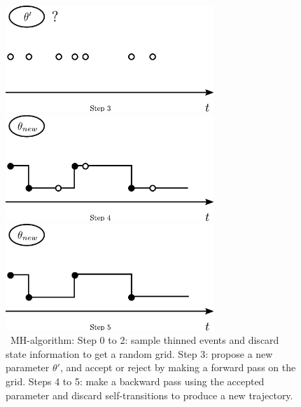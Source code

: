 \begin{figure}[H]
\begin{minipage}[!hp]{0.45\linewidth}
  \centering
    \includegraphics [width=0.70\textwidth, angle=0]{figs/plotn3.pdf}
    \vspace{-0 in}
  \end{minipage}
  \begin{minipage}[!hp]{0.45\linewidth}
  \centering
    \includegraphics [width=0.70\textwidth, angle=0]{figs/plotn4.pdf}
    \vspace{-0 in}
  \end{minipage}
  \begin{minipage}[!hp]{0.45\linewidth}
  \centering
    \includegraphics [width=0.70\textwidth, angle=0]{figs/plotn5.pdf}
    \vspace{-0 in}
  \end{minipage}
  \caption{\Naive\ MH-algorithm: Step 0 to 2: sample thinned events
  and discard state information to get a random grid. Step 3: 
propose a new parameter $\theta'$, and accept or reject by making
a forward pass on the grid. Steps 4 to 5: make a backward pass using
the accepted parameter and discard self-transitions to produce a new
trajectory.}
   \label{fig:naive_mh}
  \end{figure}

